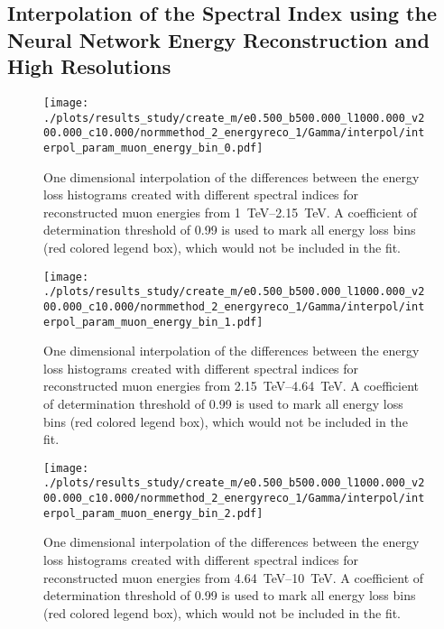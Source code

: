 %

\subsection{Interpolation of the Spectral Index using the Neural Network Energy Reconstruction and High Resolutions}

\begin{figure}[H]
    \centering
    \texttt{[image: ./plots/results\_study/create\_m/e0.500\_b500.000\_l1000.000\_v200.000\_c10.000/normmethod\_2\_energyreco\_1/Gamma/interpol/interpol\_param\_muon\_energy\_bin\_0.pdf]}
    \caption{One dimensional interpolation of the differences between the energy loss histograms created with different spectral indices for reconstructed muon energies from \SIrange{1}{2.15}{TeV}. A coefficient of determination threshold of \num{0.99} is used to mark all energy loss bins (red colored legend box), which would not be included in the fit.}
    \label{fig:study_1d_interpol_mu0_nn_high_gamma}
\end{figure}

\begin{figure}[H]
    \centering
    \texttt{[image: ./plots/results\_study/create\_m/e0.500\_b500.000\_l1000.000\_v200.000\_c10.000/normmethod\_2\_energyreco\_1/Gamma/interpol/interpol\_param\_muon\_energy\_bin\_1.pdf]}
    \caption{One dimensional interpolation of the differences between the energy loss histograms created with different spectral indices for reconstructed muon energies from \SIrange{2.15}{4.64}{TeV}. A coefficient of determination threshold of \num{0.99} is used to mark all energy loss bins (red colored legend box), which would not be included in the fit.}
    \label{fig:study_1d_interpol_mu1_nn_high_gamma}
\end{figure}

\begin{figure}[H]
    \centering
    \texttt{[image: ./plots/results\_study/create\_m/e0.500\_b500.000\_l1000.000\_v200.000\_c10.000/normmethod\_2\_energyreco\_1/Gamma/interpol/interpol\_param\_muon\_energy\_bin\_2.pdf]}
    \caption{One dimensional interpolation of the differences between the energy loss histograms created with different spectral indices for reconstructed muon energies from \SIrange{4.64}{10}{TeV}. A coefficient of determination threshold of \num{0.99} is used to mark all energy loss bins (red colored legend box), which would not be included in the fit.}
    \label{fig:study_1d_interpol_mu2_nn_high_gamma}
\end{figure}


